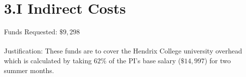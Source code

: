 \documentclass[11pt]{article}
\begin{document}
\section*{3.I Indirect Costs}
\label{sec:3.i_indirect_costs}
Funds Requested: $\$9,298$\\ \ \\ Justification: These funds are to
cover the Hendrix College university overhead which is calculated by
taking $62\%$ of the PI's base salary ($\$14,997$) for two summer
months.
\end{document}
